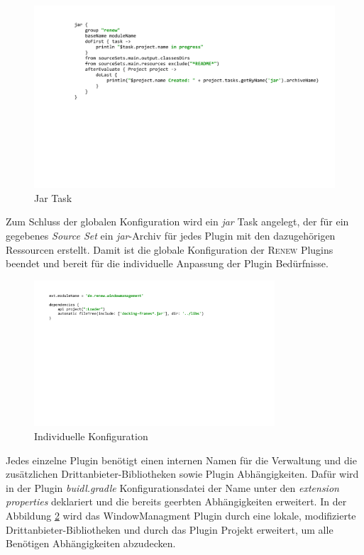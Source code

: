 	\begin{figure}[h!]
	  \centering
	  \includegraphics[width=\textwidth]{material/images/jar.pdf}
	  \caption{Jar Task}
	  \label{fig:jar}
	\end{figure}

	Zum Schluss der globalen Konfiguration wird ein \textit{jar} Task angelegt, der für ein gegebenes \textit{Source Set} ein \textit{jar}-Archiv für jedes Plugin mit den dazugehörigen Ressourcen erstellt.\newline
	Damit ist die globale Konfiguration der \textsc{Renew} Plugins beendet und bereit für die individuelle Anpassung der Plugin Bedürfnisse.\bigbreak

	\begin{figure}[h!]
	  \centering
	  \includegraphics[width=0.8\textwidth]{material/images/gradle/winmangradle.pdf}
	  \caption{Individuelle Konfiguration}
	  \label{fig:windmang}
	\end{figure}

	Jedes einzelne Plugin benötigt einen internen Namen für die Verwaltung und die zusätzlichen Drittanbieter-Bibliotheken sowie Plugin Abhängigkeiten. Dafür wird in der Plugin \textit{buidl.gradle} Konfigurationsdatei der Name unter den \textit{extension properties} deklariert und die bereits geerbten Abhängigkeiten erweitert. In der Abbildung \ref{fig:windmang} wird das WindowManagment Plugin durch eine lokale, modifizierte Drittanbieter-Bibliotheken und durch das Plugin Projekt erweitert, um alle Benötigen Abhängigkeiten abzudecken.\bigbreak

